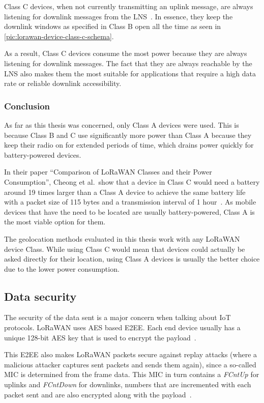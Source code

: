 Class C devices, when not currently transmitting an uplink message, are always listening for downlink messages from the \ac{LNS}~\cite[p. 86]{lora_alliance_inc_lorawan_specification_2017}.
In essence, they keep the downlink windows as specified in Class B open all the time as seen in \cref{pic:lorawan-device-class-c-schema}.

As a result, Class C devices consume the most power because they are always listening for downlink messages.
The fact that they are always reachable by the \ac{LNS} also makes them the most suitable for applications that require a high data rate or reliable downlink accessibility.

\subsubsection{Conclusion}

As far as this thesis was concerned, only Class A devices were used.
This is because Class B and C use significantly more power than Class A because they keep their radio on for extended periods of time, which drains power quickly for battery-powered devices.

In their paper ``Comparison of LoRaWAN Classes and their Power Consumption'', Cheong et al.\ show that a device in Class C would need a battery around 19 times larger than a Class A device to achieve the same battery life with a packet size of 115 bytes and a transmission interval of 1 hour~\cite{cheong_comparison_2017}.
As mobile devices that have the need to be located are usually battery-powered, Class A is the most viable option for them.

The geolocation methods evaluated in this thesis work with any \ac{LoRaWAN} device Class.
While using Class C would mean that devices could actually be asked directly for their location, using Class A devices is usually the better choice due to the lower power consumption.

\subsection{Data security}

The security of the data sent is a major concern when talking about \ac{IoT} protocols.
\ac{LoRaWAN} uses \ac{AES} based \acf{E2EE}.
Each end device usually has a unique 128-bit \ac{AES} key that is used to encrypt the payload~\cite[p. 24]{lora_alliance_inc_lorawan_specification_2017}.

This \ac{E2EE} also makes \ac{LoRaWAN} packets secure against replay attacks (where a malicious attacker captures sent packets and sends them again), since a so-called \ac{MIC} is determined from the frame data.
This \ac{MIC} in turn contains a \emph{FCntUp} for uplinks and \emph{FCntDown} for downlinks, numbers that are incremented with each packet sent and are also encrypted along with the payload~\cite[p. 22f.]{lora_alliance_inc_lorawan_specification_2017}.


